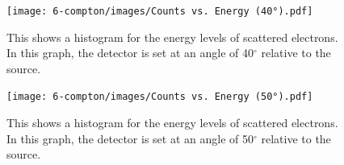 \documentclass[a4paper,12pt,english]{all-in-one} %
\begin{document}
\begin{figure}[tbh]
    \centering
    \texttt{[image: 6-compton/images/Counts vs. Energy (40°).pdf]}
    \caption{ This shows a histogram for the energy levels of scattered electrons. In this graph, the detector is set at an angle of 40$^\circ$ relative to the source.
    }
    \label{fig:compton40}
\end{figure}

\begin{figure}[tbh]
    \centering
    \texttt{[image: 6-compton/images/Counts vs. Energy (50°).pdf]}
    \caption{ This shows a histogram for the energy levels of scattered electrons. In this graph, the detector is set at an angle of 50$^\circ$ relative to the source.
    }
    \label{fig:compton50}
\end{figure}
\end{document}
